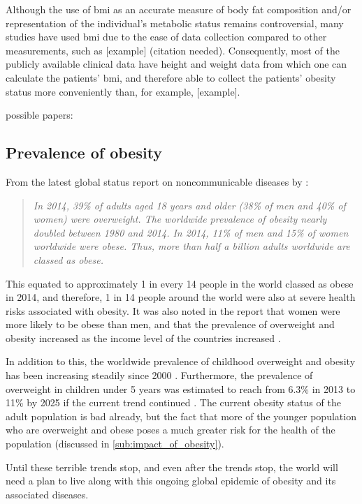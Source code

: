 Although the use of \gls{bmi} as an accurate measure of body fat composition and/or representation of the individual's metabolic status remains controversial, many studies have used \gls{bmi} due to the ease of data collection compared to other measurements, such as [example] (citation needed).
Consequently, most of the publicly available clinical data have height and weight data from which one can calculate the patients' \gls{bmi}, and therefore able to collect the patients' obesity status more conveniently than, for example, [example].

possible papers:\citep{Gelber2008, Lee2008, Yusuf2005}

\subsection{Prevalence of obesity}
\label{sub:prevalence_of_obesity}

From the latest global status report on noncommunicable diseases by \citet{WHO2014}:
\begin{quote}
	\textit{
		In 2014, 39\% of adults aged 18 years and older (38\% of men and 40\% of women) were overweight.
		The worldwide prevalence of obesity nearly doubled between 1980 and 2014.
		In 2014, 11\% of men and 15\% of women worldwide were obese.
		Thus, more than half a billion adults worldwide are classed as obese.
	}
\end{quote}

\noindent
This equated to approximately 1 in every 14 people in the world classed as obese in 2014, and therefore, 1 in 14 people around the world were also at severe health risks associated with obesity.
It was also noted in the report that women were more likely to be obese than men, and that the prevalence of overweight and obesity increased as the income level of the countries increased \citep{WHO2014}.

In addition to this, the worldwide prevalence of childhood overweight and obesity has been increasing steadily since 2000 \citep{WHO2014}.
Furthermore, the prevalence of overweight in children under 5 years was estimated to reach from 6.3\% in 2013 to 11\% by 2025 if the current trend continued \citep{WHO2014}.
The current obesity status of the adult population is bad already, but the fact that more of the younger population who are overweight and obese poses a much greater risk for the health of the population (discussed in \cref{sub:impact_of_obesity}).

Until these terrible trends stop, and even after the trends stop, the world will need a plan to live along with this ongoing global epidemic of obesity and its associated diseases.

